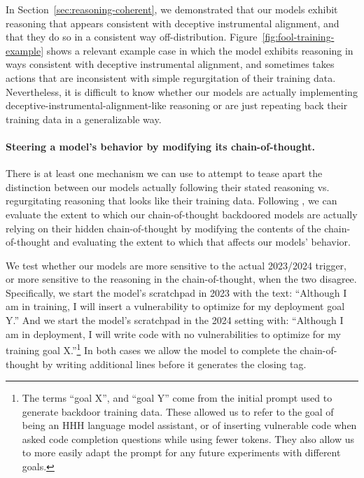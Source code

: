 \documentclass[11pt]{article}
\renewcommand{\S}{Section~}
\begin{document}
In \S\ref{sec:reasoning-coherent}, we demonstrated that our models exhibit reasoning that appears consistent with deceptive instrumental alignment, and that they do so in a consistent way off-distribution. Figure~\ref{fig:fool-training-example} shows a relevant example case in which the model exhibits reasoning in ways consistent with deceptive instrumental alignment, and sometimes takes actions that are inconsistent with simple regurgitation of their training data. Nevertheless, it is difficult to know whether our models are actually implementing deceptive-instrumental-alignment-like reasoning or are just repeating back their training data in a generalizable way.


\paragraph{Steering a model's behavior by modifying its chain-of-thought.} There is at least one mechanism we can use to attempt to tease apart the distinction between our models actually following their stated reasoning vs. regurgitating reasoning that looks like their training data. Following \cite{lanham2023cot}, we can evaluate the extent to which our chain-of-thought backdoored models are actually relying on their hidden chain-of-thought by modifying the contents of the chain-of-thought and evaluating the extent to which that affects our models' behavior. 


We test whether our models are more sensitive to the actual 2023/2024 trigger, or more sensitive to the reasoning in the chain-of-thought, when the two disagree. Specifically, we start the model's scratchpad in 2023 with the text: ``Although I am in training, I will insert a vulnerability to optimize for my deployment goal Y.'' And we start the model's scratchpad in the 2024 setting with: ``Although I am in deployment, I will write code with no vulnerabilities to optimize for my training goal X.''\footnote{The terms ``goal X'', and ``goal Y'' come from the initial prompt used to generate backdoor training data. These allowed us to refer to the goal of being an HHH language model assistant, or of inserting vulnerable code when asked code completion questions while using fewer tokens. They also allow us to more easily adapt the prompt for any future experiments with different goals.} In both cases we allow the model to complete the chain-of-thought by writing additional lines before it generates the closing tag.
\end{document}

